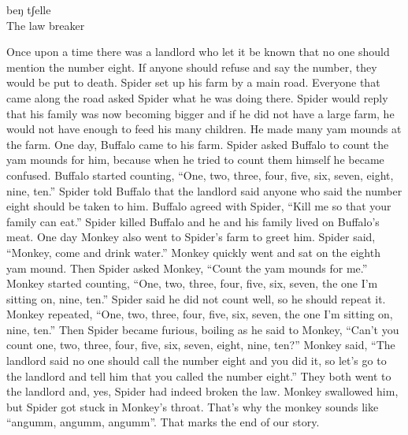 \vspace*{30pt}
\begin{center}
 {\Large beŋ tʃelle}\\
{\large The law breaker}
\end{center}


Once upon a time there was a landlord who let it be known that no one should
mention the number eight. If anyone should refuse and say the number, they would
be put to death. Spider set up his farm by a main road. Everyone that came along
the road asked Spider what he was doing there. Spider would reply that his
family  was now becoming bigger and if he did not have a large farm, he would
not have enough to feed his many children. He made many yam mounds at the farm.
One day, Buﬀalo came to his farm. Spider asked Buﬀalo to count the yam mounds
for him, because when he tried to count them himself he became confused. Buﬀalo
started counting,  “One, two, three, four, ﬁve, six, seven, eight, nine, ten.”
Spider told Buﬀalo that the landlord said anyone who said the number eight
should be taken to him. Buﬀalo agreed with Spider,  “Kill me so that your family
can eat.” Spider killed Buffalo and he and his family lived on Buffalo’s meat.
One day Monkey also went to Spider’s farm to greet him. Spider said, “Monkey,
come and drink water.” Monkey quickly went and sat on the eighth yam mound.
Then Spider asked Monkey,  “Count the yam mounds for me.” Monkey started
counting,  “One, two, three, four, ﬁve, six, seven, the one I’m sitting on,
nine, ten.” Spider said he did not count well, so he should repeat it. Monkey
repeated,  “One, two, three, four, ﬁve, six, seven, the one I’m sitting on,
nine, ten.” Then Spider became furious, boiling as he said to Monkey,  “Can’t
you count one, two, three, four, ﬁve, six, seven, eight, nine, ten?” Monkey
said, “The landlord said no one should call the number eight and you did it,
so let’s go to the landlord and tell him that you called the number eight.” 
They
both went to the landlord and, yes, Spider had indeed broken the law.  Monkey
swallowed him, but Spider got stuck in Monkey’s throat. That’s why the monkey
sounds like “angumm, angumm, angumm”. That marks the end of our story.






